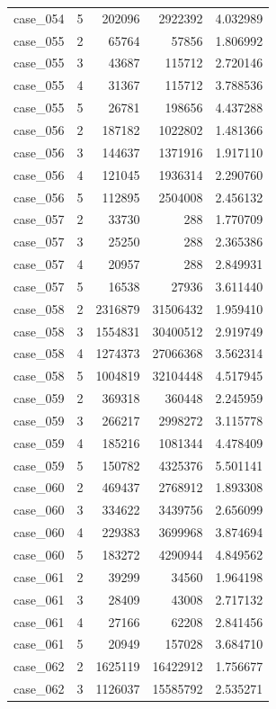 \begin{longtable}{lrrrr}
case\_054 & 5 & 202096 & 2922392 & 4.032989 \\
case\_055 & 2 & 65764 & 57856 & 1.806992 \\
case\_055 & 3 & 43687 & 115712 & 2.720146 \\
case\_055 & 4 & 31367 & 115712 & 3.788536 \\
case\_055 & 5 & 26781 & 198656 & 4.437288 \\
case\_056 & 2 & 187182 & 1022802 & 1.481366 \\
case\_056 & 3 & 144637 & 1371916 & 1.917110 \\
case\_056 & 4 & 121045 & 1936314 & 2.290760 \\
case\_056 & 5 & 112895 & 2504008 & 2.456132 \\
case\_057 & 2 & 33730 & 288 & 1.770709 \\
case\_057 & 3 & 25250 & 288 & 2.365386 \\
case\_057 & 4 & 20957 & 288 & 2.849931 \\
case\_057 & 5 & 16538 & 27936 & 3.611440 \\
case\_058 & 2 & 2316879 & 31506432 & 1.959410 \\
case\_058 & 3 & 1554831 & 30400512 & 2.919749 \\
case\_058 & 4 & 1274373 & 27066368 & 3.562314 \\
case\_058 & 5 & 1004819 & 32104448 & 4.517945 \\
case\_059 & 2 & 369318 & 360448 & 2.245959 \\
case\_059 & 3 & 266217 & 2998272 & 3.115778 \\
case\_059 & 4 & 185216 & 1081344 & 4.478409 \\
case\_059 & 5 & 150782 & 4325376 & 5.501141 \\
case\_060 & 2 & 469437 & 2768912 & 1.893308 \\
case\_060 & 3 & 334622 & 3439756 & 2.656099 \\
case\_060 & 4 & 229383 & 3699968 & 3.874694 \\
case\_060 & 5 & 183272 & 4290944 & 4.849562 \\
case\_061 & 2 & 39299 & 34560 & 1.964198 \\
case\_061 & 3 & 28409 & 43008 & 2.717132 \\
case\_061 & 4 & 27166 & 62208 & 2.841456 \\
case\_061 & 5 & 20949 & 157028 & 3.684710 \\
case\_062 & 2 & 1625119 & 16422912 & 1.756677 \\
case\_062 & 3 & 1126037 & 15585792 & 2.535271 \\

\end{longtable}
